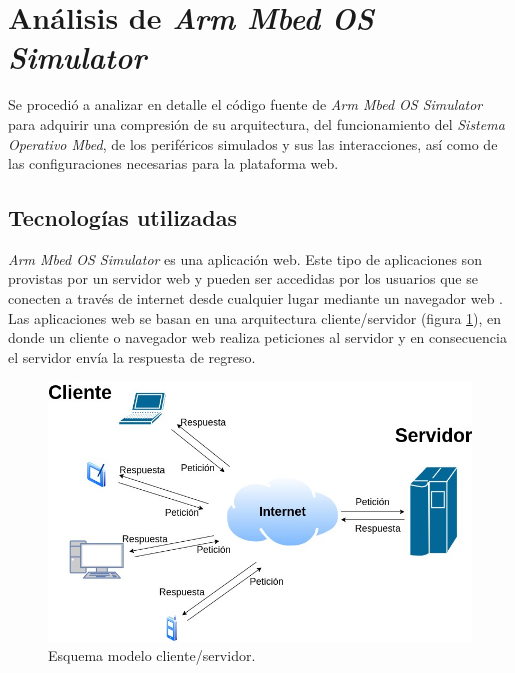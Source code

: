 \section{Análisis de \textit{Arm Mbed OS Simulator}}

Se procedió a analizar en detalle el código fuente de \textit{Arm Mbed OS Simulator} para adquirir una compresión de su arquitectura, del funcionamiento del \textit{Sistema Operativo Mbed}, de los periféricos simulados y sus las interacciones, así como de las configuraciones necesarias para la plataforma web.

\subsection{Tecnologías utilizadas}
\label{sec:Tecnologías utilizada}

\textit{Arm Mbed OS Simulator} es una aplicación web. Este tipo de aplicaciones son provistas por un servidor web y pueden ser accedidas por los usuarios que se conecten a través de internet desde cualquier lugar mediante un navegador web \citep{NavegadorWeb}. Las aplicaciones web se basan en una arquitectura cliente/servidor (figura \ref{fig:ClienteServidor}), en donde un cliente o navegador web realiza peticiones al servidor y en consecuencia el servidor envía la respuesta de regreso.

\begin{figure}[ht]
	\centering
	\includegraphics[scale=.48]{./Figures/EsquemaCliente_Servidor.jpg}
	\caption{Esquema modelo cliente/servidor.}
	\label{fig:ClienteServidor}
\end{figure}

